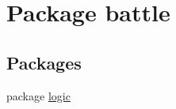 \hypertarget{namespacebattle}{}\section{Package battle}
\label{namespacebattle}
\subsection*{Packages}
\begin{DoxyCompactItemize}
\item 
package \hyperlink{namespacebattle_1_1logic}{logic}
\end{DoxyCompactItemize}
